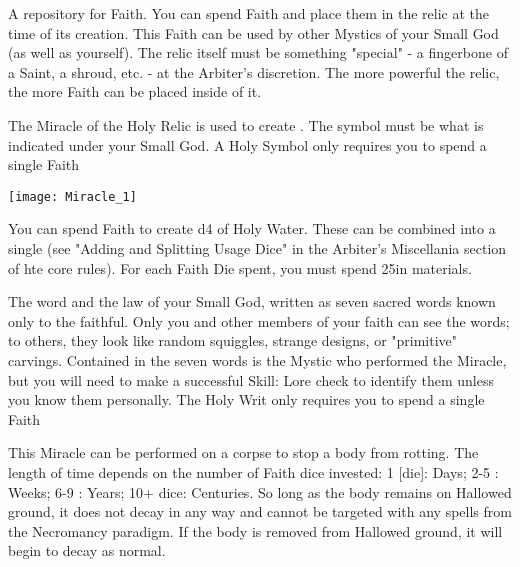 {

A repository for Faith.  You can spend \DICE Faith and place them in the relic at the time of its creation.  This Faith can be used by other Mystics of your Small God (as well as yourself).  The relic itself must be something "special" - a fingerbone of a Saint, a shroud, etc.  - at the Arbiter's discretion.  The more powerful the relic, the more Faith can be placed inside of it.

The Miracle of the Holy Relic is used to create .  The symbol must be what is indicated under your Small God.  A Holy Symbol only requires you to spend a single Faith \POOL

  \begin{center}
  \texttt{[image: Miracle\_1]}
  \end{center}



You can spend \DICE Faith to create \DICE d4 \UD of Holy Water.  These \UD can be combined into a single \UD (see "Adding and Splitting Usage Dice" in the Arbiter's Miscellania section of hte core rules). For each Faith Die spent, you must spend 25\AG in materials.


The word and the law of your Small God, written as seven sacred words known only to the faithful.  Only you and other members of your faith can see the words; to others, they look like random squiggles, strange designs, or "primitive" carvings.  Contained in the seven words is the Mystic who performed the Miracle, but you will need to make a successful Skill: Lore check to identify them unless you know them personally.   The Holy Writ only requires you to spend a single Faith \POOL



This Miracle can be performed on a corpse to stop a body from rotting.  The length of time depends on the number of Faith dice invested:  1 [die]: \SUMDICE Days; 2-5 \DICE: \SUMDICE Weeks; 6-9 \DICE: \SUMDICE Years; 10+ dice: \SUMDICE Centuries.  So long as the body remains on Hallowed ground, it does not decay in any way and cannot be targeted with any spells from the Necromancy paradigm.  If the body is removed from Hallowed ground, it will begin to decay as normal.


}
